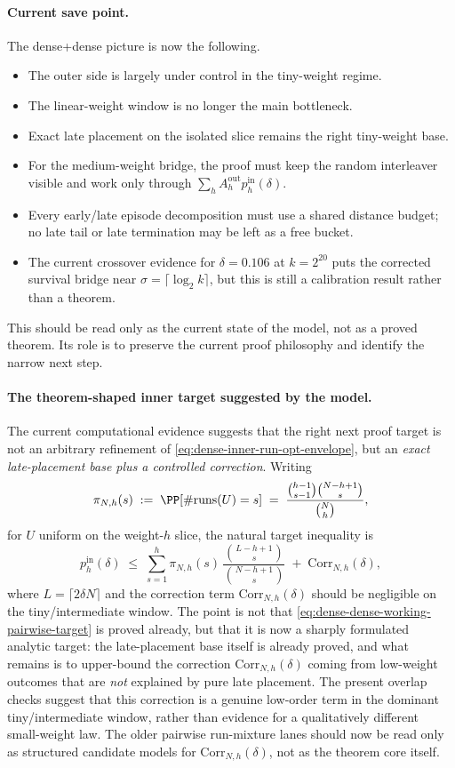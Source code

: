 \paragraph{Current save point.}
The dense+dense picture is now the following.
\begin{itemize}
\item The outer side is largely under control in the tiny-weight regime.
\item The linear-weight window is no longer the main bottleneck.
\item Exact late placement on the isolated slice remains the right tiny-weight base.
\item For the medium-weight bridge, the proof must keep the random interleaver visible and work only through
\(\sum_h A_h^{\mathrm{out}}p_h^{\mathrm{in}}(\delta)\).
\item Every early/late episode decomposition must use a shared distance budget; no late tail or late termination may be
left as a free bucket.
\item The current crossover evidence for \(\delta=0.106\) at \(k=2^{20}\) puts the corrected survival bridge near
\(\sigma=\lceil\log_2 k\rceil\), but this is still a calibration result rather than a theorem.
\end{itemize}
This should be read only as the current state of the model, not as a proved theorem. Its role is to preserve the
current proof philosophy and identify the narrow next step.

\paragraph{The theorem-shaped inner target suggested by the model.}
The current computational evidence suggests that the right next proof target is not an arbitrary refinement of
\eqref{eq:dense-inner-run-opt-envelope}, but an \emph{exact late-placement base plus a controlled correction}. Writing
\[
\pi_{N,h}(s)
\;:=\;
\PP[\#\mathrm{runs}(U)=s]
\;=\;
\frac{\binom{h-1}{s-1}\binom{N-h+1}{s}}{\binom{N}{h}},
\]
for \(U\) uniform on the weight-\(h\) slice, the natural target inequality is
\begin{equation}
\label{eq:dense-dense-working-pairwise-target}
p_h^{\mathrm{in}}(\delta)
\;\le\;
\sum_{s=1}^{h}
\pi_{N,h}(s)\,
\frac{\binom{L-h+1}{s}}{\binom{N-h+1}{s}}
\;+\; \mathrm{Corr}_{N,h}(\delta),
\end{equation}
where \(L=\lceil 2\delta N\rceil\) and the correction term \(\mathrm{Corr}_{N,h}(\delta)\) should be negligible on the
tiny/intermediate window.
The point is not that \eqref{eq:dense-dense-working-pairwise-target} is proved already, but that it is now a sharply
formulated analytic target: the late-placement base itself is already proved, and what remains is to upper-bound the
correction \(\mathrm{Corr}_{N,h}(\delta)\) coming from low-weight outcomes that are \emph{not} explained by pure
late placement. The present overlap checks suggest that this correction is a genuine low-order term in the dominant
tiny/intermediate window, rather than evidence for a qualitatively different small-weight law. The older pairwise
run-mixture lanes should now be read only as structured candidate models for \(\mathrm{Corr}_{N,h}(\delta)\), not as
the theorem core itself.


